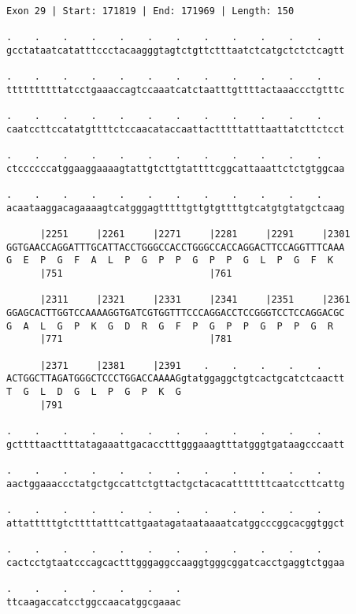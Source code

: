 \documentclass{article}
\begin{document}
\begin{Verbatim}[fontfamily=courier]
Exon 29 | Start: 171819 | End: 171969 | Length: 150

.    .    .    .    .    .    .    .    .    .    .    .    
gcctataatcatatttccctacaagggtagtctgttctttaatctcatgctctctcagtt

.    .    .    .    .    .    .    .    .    .    .    .    
ttttttttttatcctgaaaccagtccaaatcatctaatttgttttactaaaccctgtttc

.    .    .    .    .    .    .    .    .    .    .    .    
caatccttccatatgttttctccaacataccaattactttttatttaattatcttctcct

.    .    .    .    .    .    .    .    .    .    .    .    
ctccccccatggaaggaaaagtattgtcttgtattttcggcattaaattctctgtggcaa

.    .    .    .    .    .    .    .    .    .    .    .    
acaataaggacagaaaagtcatgggagtttttgttgtgttttgtcatgtgtatgctcaag

      |2251     |2261     |2271     |2281     |2291     |2301
GGTGAACCAGGATTTGCATTACCTGGGCCACCTGGGCCACCAGGACTTCCAGGTTTCAAA
G  E  P  G  F  A  L  P  G  P  P  G  P  P  G  L  P  G  F  K  
      |751                          |761                    

      |2311     |2321     |2331     |2341     |2351     |2361
GGAGCACTTGGTCCAAAAGGTGATCGTGGTTTCCCAGGACCTCCGGGTCCTCCAGGACGC
G  A  L  G  P  K  G  D  R  G  F  P  G  P  P  G  P  P  G  R  
      |771                          |781                    

      |2371     |2381     |2391    .    .    .    .    .    
ACTGGCTTAGATGGGCTCCCTGGACCAAAAGgtatggaggctgtcactgcatctcaactt
T  G  L  D  G  L  P  G  P  K  G                             
      |791                                                  

.    .    .    .    .    .    .    .    .    .    .    .    
gcttttaacttttatagaaattgacacctttgggaaagtttatgggtgataagcccaatt

.    .    .    .    .    .    .    .    .    .    .    .    
aactggaaaccctatgctgccattctgttactgctacacatttttttcaatccttcattg

.    .    .    .    .    .    .    .    .    .    .    .    
attatttttgtcttttatttcattgaatagataataaaatcatggcccggcacggtggct

.    .    .    .    .    .    .    .    .    .    .    .    
cactcctgtaatcccagcactttgggaggccaaggtgggcggatcacctgaggtctggaa

.    .    .    .    .    .    .
ttcaagaccatcctggccaacatggcgaaac
\end{Verbatim}
\end{document}
